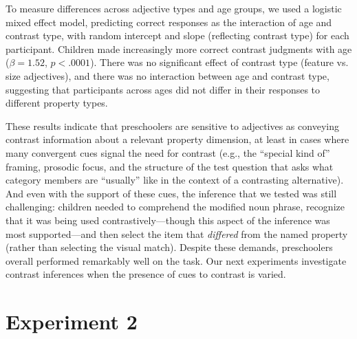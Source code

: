 \documentclass[man]{apa2}
\begin{document}
To measure differences across adjective types and age groups, we used a logistic mixed effect model, predicting correct responses as the interaction of age and contrast type, with random intercept and slope (reflecting contrast type) for each participant.  Children made increasingly more correct contrast judgments with age ($\beta = 1.52$, $p < .0001$). There was no significant effect of contrast type (feature vs. size adjectives), and there was no interaction between age and contrast type, suggesting that participants across ages did not differ in their responses to different property types.  

These results indicate that preschoolers are sensitive to adjectives as conveying contrast information about a relevant property dimension, at least in cases where many convergent cues signal the need for contrast (e.g., the ``special kind of'' framing, prosodic focus, and the structure of the test question that asks what category members are ``usually'' like in the context of a contrasting alternative). And even with the support of these cues, the inference that we tested was still challenging: children needed to comprehend the modified noun phrase, recognize that it was being used contrastively---though this aspect of the inference was most supported---and then select the item that \emph{differed} from the named property (rather than selecting the visual match). Despite these demands, preschoolers overall performed remarkably well on the task.  Our next experiments investigate contrast inferences when the presence of cues to contrast is varied.





\section{Experiment 2}

\end{document}
